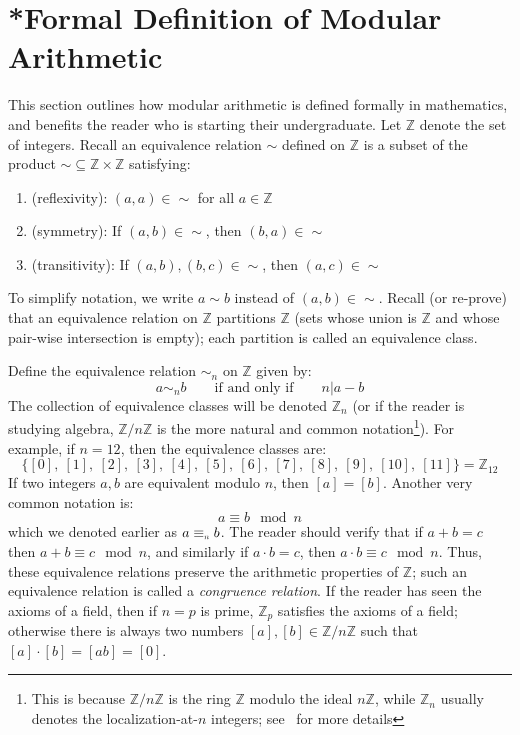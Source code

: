 \documentclass{article}
\newcommand\scalemath[2]{\scalebox{#1}{\mbox{\ensuremath{\displaystyle #2}}}}
\newcommand{\Equiv}[1]{\equiv_{\scalemath{0.6}{#1}}}
\newcommand{\Z}{\mathbb{Z}}
\renewcommand{\mid}{\big|}
\newcommand{\sse}{\subseteq}
\begin{document}
\section{*Formal Definition of Modular Arithmetic}

This section outlines how modular arithmetic is defined formally in mathematics, and benefits the reader who
is starting their undergraduate. Let $\Z$ denote the set of integers. Recall an equivalence relation $\sim$
defined on $\Z$ is a subset of the product $\sim \sse \Z\times \Z$  satisfying:

\begin{enumerate}
  \item (reflexivity): $(a,a) \in \sim$ for all $a \in \Z$
  \item (symmetry): If $(a,b) \in \sim$, then $(b,a) \in \sim$
  \item (transitivity): If $(a,b), (b,c) \in \sim$, then $(a,c) \in \sim$
\end{enumerate}

To simplify notation, we write $a\sim b$ instead of $(a,b) \in \sim$. Recall (or re-prove) that an equivalence
relation on $\Z$ partitions $\Z$ (sets whose union is $\Z$ and whose pair-wise intersection is empty); each
partition is called an equivalence class.

Define the equivalence relation $\sim_n$ on $\Z$ given by:
\[
  a\sim_n b \qquad \text{if and only if} \qquad n\mid a-b
\]
The collection of equivalence classes will be denoted $\Z_n$ (or if the reader is studying algebra, $\Z/n\Z$
is the more natural and common notation\footnote{This is because $\Z/n\Z$ is the ring $\Z$ modulo the ideal $n\Z$,
while $\Z_n$ usually denotes the localization-at-$n$ integers; see~\cite[chapter~9,
chapter~20.3]{NateAlgebra} for more details}). For example, if $n = 12$, then the equivalence classes are:
\[
  \{[0],\ [1],\ [2],\ [3],\ [4],\ [5],\ [6],\ [7],\ [8],\ [9],\ [10],\ [11]\} = \Z_{12}
\]
If two integers $a,b$ are equivalent modulo $n$, then $[a] = [b]$. Another very common notation is:
\[
  a\equiv b\mod n
\]
which we denoted earlier as $a\Equiv{n} b$. The reader should verify that if $a+b = c$ then $a+b\equiv c \mod
n$, and similarly if $a\cdot b = c$, then $a\cdot b \equiv c \mod n$. Thus, these equivalence relations
preserve the arithmetic properties of $\Z$; such an equivalence relation is called a \emph{congruence
relation}. If the reader has seen the axioms of a field, then if $n=p$ is prime, $\Z_p$ satisfies the axioms
of a field; otherwise there is always two numbers $[a],[b] \in \Z/n\Z$ such that $[a]\cdot[b] = [ab] = [0]$.
\end{document}
